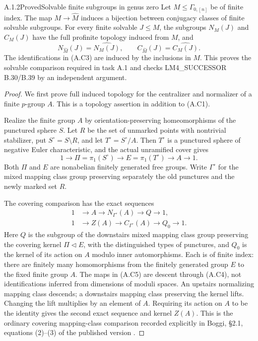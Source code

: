 \begin{result}{A.1.2}{Proved}{Solvable finite subgroups in genus zero}
Let $M\leq\Gamma_{0,[n]}$ be of finite index.  The map
$M\to\widehat M$ induces a bijection between conjugacy classes of
finite solvable subgroups.  For every finite solvable $J\leq M$,
the subgroups $N_M(J)$ and $C_M(J)$ have the full profinite topology
induced from $M$, and
\[
 N_{\widehat M}(J)=\widehat{N_M(J)},\qquad
 C_{\widehat M}(J)=\widehat{C_M(J)}.                    \tag{A.C3}
\]
The identifications in (A.C3) are induced by the inclusions in $M$.
This proves the solvable comparison required in task A.1 and checks
LM4\_SUCCESSOR B.30/B.39 by an independent argument.
\end{result}
\begin{proof}
We first prove full induced topology for the centralizer and
normalizer of a finite $p$-group $A$.  This is a topology assertion
in addition to (A.C1).

Realize the finite group $A$ by orientation-preserving
homeomorphisms of the punctured sphere $S$.  Let $R$ be the set of
unmarked points with nontrivial stabilizer, put
$S^\circ=S\setminus R$, and let
$T^\circ=S^\circ/A$.  Then $T^\circ$ is a punctured sphere of
negative Euler characteristic, and the actual unramified cover gives
\[
 1\longrightarrow\Pi=\pi_1(S^\circ)
 \longrightarrow E=\pi_1(T^\circ)
 \longrightarrow A\longrightarrow1.                    \tag{A.C4}
\]
Both $\Pi$ and $E$ are nonabelian finitely generated free groups.
Write $\Gamma^\circ$ for the mixed mapping class group preserving
separately the old punctures and the newly marked set $R$.

The covering comparison has the exact sequences
\[
\begin{split}
 1&\longrightarrow A\longrightarrow N_{\Gamma^\circ}(A)
       \longrightarrow Q\longrightarrow1,\\
 1&\longrightarrow Z(A)\longrightarrow C_{\Gamma^\circ}(A)
       \longrightarrow Q_0\longrightarrow1.             \tag{A.C5}
\end{split}
\]
Here $Q$ is the subgroup of the downstairs mixed mapping class group
preserving the covering kernel $\Pi\triangleleft E$, with the
distinguished types of punctures, and $Q_0$ is the kernel of its
action on $A$ modulo inner automorphisms.  Each is of finite index:
there are finitely many homomorphisms from the finitely generated
group $E$ to the fixed finite group $A$.  The maps in (A.C5) are
descent through (A.C4), not identifications inferred from dimensions
of moduli spaces.  An upstairs normalizing mapping class descends;
a downstairs mapping class preserving the kernel lifts.  Changing
the lift multiplies by an element of $A$.  Requiring its action on
$A$ to be the identity gives the second exact sequence and kernel
$Z(A)$.  This is the ordinary covering mapping-class comparison
recorded explicitly in Boggi, \S2.1, equations (2)--(3)
of the published version \cite{CA_Boggi2026}.


\end{proof}
